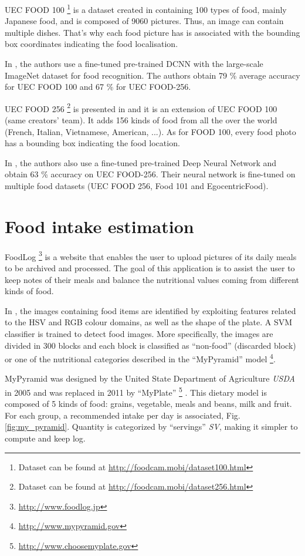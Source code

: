 UEC FOOD 100 \footnote{Dataset can be found at \url{http://foodcam.mobi/dataset100.html}} is a dataset created in \cite{Matsuda2012a} containing 100 types of food, mainly Japanese food, and is composed of 9060 pictures. Thus, an image can contain multiple dishes. That's why each food picture has is associated with the bounding box coordinates indicating the food localisation.


In \cite{Yanai2015}, the authors use a fine-tuned pre-trained DCNN with the large-scale ImageNet dataset for food recognition. The authors obtain 79 \% average accuracy for UEC FOOD 100 and 67 \% for UEC FOOD-256.

UEC FOOD 256 \footnote{Dataset can be found at \url{http://foodcam.mobi/dataset256.html}} is presented in \cite{Kawano2015} and it is an extension of UEC FOOD 100 (same creators' team). It adds 156 kinds of food from all the over the world (French, Italian, Vietnamese, American, ...). As for FOOD 100, every food photo has a bounding box indicating the food location.

In \cite{Bolanos2016}, the authors also use a fine-tuned pre-trained Deep Neural Network and obtain 63 \% accuracy on UEC FOOD-256. Their neural network is fine-tuned on multiple food datasets (UEC FOOD 256, Food 101 and EgocentricFood).

\section{Food intake estimation}


FoodLog \footnote{\url{http://www.foodlog.jp}} is a website that enables the user to upload pictures of its daily meals to be archived and processed. The goal of this application is to assist the user to keep notes of their meals and balance the nutritional values coming from different kinds of food.

In \cite{Kitamura2008}, the images containing food items are identified by exploiting features related to the HSV and RGB colour domains, as well as the shape of the plate. A SVM classifier is trained to detect food images. More specifically, the images are divided in 300 blocks and each block is classified as \enquote{non-food} (discarded block) or one of the nutritional categories described in the \enquote{MyPyramid} model \footnote{\url{http://www.mypyramid.gov}}.

MyPyramid \cite{MyPyramid} was designed by the United State Department of Agriculture \textit{USDA} in 2005 and was replaced in 2011 by \enquote{MyPlate} \footnote{\url{http://www.choosemyplate.gov}} \cite{MyPlate}. This dietary model is composed of 5 kinds of food: grains, vegetable, meals and beans, milk and fruit. For each group, a recommended intake per day is associated, Fig. \ref{fig:my_pyramid}. Quantity is categorized by \enquote{servings} \textit{SV}, making it simpler to compute and keep log.

